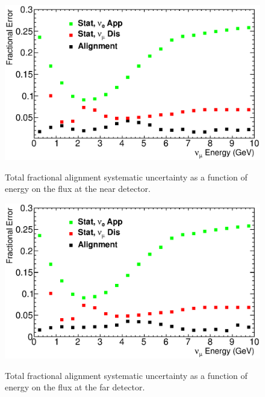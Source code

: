 \begin{figure}[ht]
  \begin{center}
    {\includegraphics[width=6.0in]{figures/tot_error_near.eps}}
  \end{center}
\caption{ Total fractional alignment systematic uncertainty as a function of energy on the flux at the near detector. }
\end{figure}

\begin{figure}[ht]
  \begin{center}
    {\includegraphics[width=6.0in]{figures/tot_error_far.eps}}
  \end{center}
\caption{ Total fractional alignment systematic uncertainty as a function of energy on the flux at the far detector. }
\end{figure}


